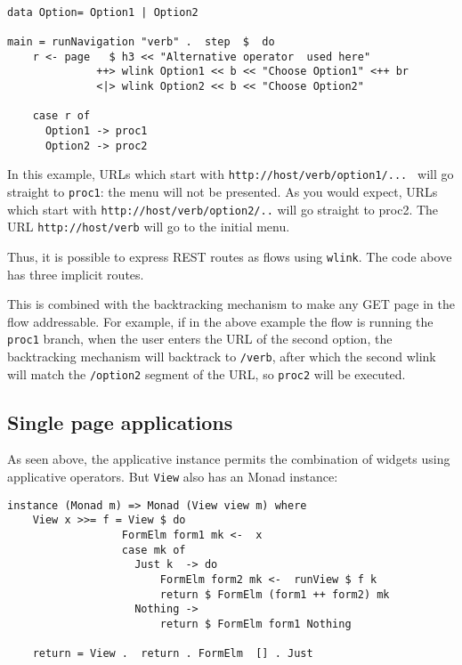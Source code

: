 \documentclass{tmr}
\begin{document}
{\tt 
 
\begin{verbatim} 
 
data Option= Option1 | Option2 
 
main = runNavigation "verb" .  step  $  do 
    r <- page   $ h3 << "Alternative operator  used here" 
              ++> wlink Option1 << b << "Choose Option1" <++ br 
              <|> wlink Option2 << b << "Choose Option2" 
 
    case r of 
      Option1 -> proc1 
      Option2 -> proc2 
\end{verbatim} 
 
} 
 
In this example, URLs which start with {\tt http://host/verb/option1/... } will go straight to {\tt proc1}:  the menu will not be presented.  As you would expect, URLs which start with {\tt http://host/verb/option2/..} will go straight to proc2.  The URL {\tt http://host/verb} will go to the initial menu. 
 
Thus, it is possible to express REST routes as flows using {\tt wlink}. The code above has three implicit routes. 
 
This is combined with the backtracking mechanism to make any GET page in the flow addressable. For example, if in the above example the flow is running the {\tt proc1} branch, when the user enters the URL of the second option, the backtracking mechanism will backtrack to {\tt /verb}, after which the second wlink will match the {\tt /option2} segment of the URL, so {\tt proc2} will be executed. 
 
\subsection{Single page applications} 

As seen above, the applicative instance permits the combination of widgets using applicative operators. But {\tt View} also has an Monad instance: 
 
{\tt 
 
\begin{verbatim} 
instance (Monad m) => Monad (View view m) where 
    View x >>= f = View $ do 
                  FormElm form1 mk <-  x 
                  case mk of 
                    Just k  -> do 
                        FormElm form2 mk <-  runView $ f k 
                        return $ FormElm (form1 ++ form2) mk 
                    Nothing -> 
                        return $ FormElm form1 Nothing 
 
    return = View .  return . FormElm  [] . Just 
\end{verbatim} 
 
} 
 
\end{document}
